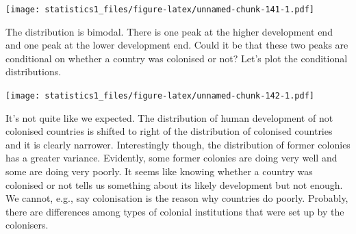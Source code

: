 \documentclass[]{article}
\newenvironment{Shaded}{\begin{snugshade}}{\end{snugshade}}
\newcommand{\KeywordTok}[1]{\textcolor[rgb]{0.13,0.29,0.53}{\textbf{#1}}}
\newcommand{\DataTypeTok}[1]{\textcolor[rgb]{0.13,0.29,0.53}{#1}}
\newcommand{\DecValTok}[1]{\textcolor[rgb]{0.00,0.00,0.81}{#1}}
\newcommand{\StringTok}[1]{\textcolor[rgb]{0.31,0.60,0.02}{#1}}
\newcommand{\OperatorTok}[1]{\textcolor[rgb]{0.81,0.36,0.00}{\textbf{#1}}}
\newcommand{\NormalTok}[1]{#1}
\theoremstyle{definition}
\theoremstyle{definition}
\theoremstyle{definition}
\theoremstyle{remark}
\begin{document}
\begin{Shaded}
\end{Shaded}

\texttt{[image: statistics1\_files/figure-latex/unnamed-chunk-141-1.pdf]}

The distribution is bimodal. There is one peak at the higher development
end and one peak at the lower development end. Could it be that these
two peaks are conditional on whether a country was colonised or not?
Let's plot the conditional distributions.

\begin{Shaded}
\end{Shaded}

\texttt{[image: statistics1\_files/figure-latex/unnamed-chunk-142-1.pdf]}

It's not quite like we expected. The distribution of human development
of not colonised countries is shifted to right of the distribution of
colonised countries and it is clearly narrower. Interestingly though,
the distribution of former colonies has a greater variance. Evidently,
some former colonies are doing very well and some are doing very poorly.
It seems like knowing whether a country was colonised or not tells us
something about its likely development but not enough. We cannot, e.g.,
say colonisation is the reason why countries do poorly. Probably, there
are differences among types of colonial institutions that were set up by
the colonisers.
\end{document}
